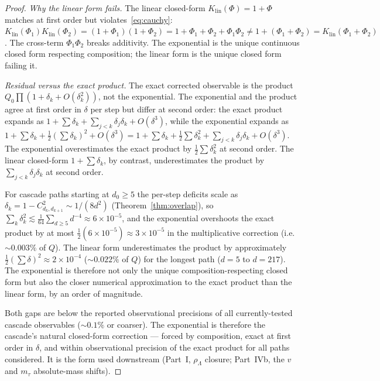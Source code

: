 \documentclass[11pt,a4paper]{article}
\begin{document}
\begin{proof}
\emph{Why the linear form fails.} The linear closed-form
$K_{\mathrm{lin}}(\Phi) = 1 + \Phi$ matches at first order but
violates~\eqref{eq:cauchy}: $K_{\mathrm{lin}}(\Phi_1) K_{\mathrm{lin}}(\Phi_2)
= (1 + \Phi_1)(1 + \Phi_2) = 1 + \Phi_1 + \Phi_2 + \Phi_1\Phi_2 \neq
1 + (\Phi_1 + \Phi_2) = K_{\mathrm{lin}}(\Phi_1 + \Phi_2)$. The cross-term
$\Phi_1\Phi_2$ breaks additivity. The exponential is the unique
continuous closed form respecting composition; the linear form is the
unique closed form failing it.

\emph{Residual versus the exact product.} The exact corrected
observable is the product $Q_0\prod(1 + \delta_k + O(\delta_k^2))$, not
the exponential. The exponential and the product agree at first order
in $\delta$ per step but differ at second order: the exact product
expands as $1 + \sum\delta_k + \sum_{j<k}\delta_j\delta_k + O(\delta^3)$,
while the exponential expands as $1 + \sum\delta_k + \tfrac{1}{2}(\sum\delta_k)^2 + O(\delta^3)
= 1 + \sum\delta_k + \tfrac{1}{2}\sum\delta_k^2 + \sum_{j<k}\delta_j\delta_k + O(\delta^3)$.
The exponential overestimates the exact product by
$\tfrac{1}{2}\sum\delta_k^2$ at second order. The linear closed-form
$1 + \sum\delta_k$, by contrast, underestimates the product by
$\sum_{j<k}\delta_j\delta_k$ at second order.

For cascade paths starting at $d_0\geq 5$ the per-step deficits scale
as $\delta_k = 1 - C^2_{d_k,d_{k+1}} \sim 1/(8d^2)$
(Theorem~\ref{thm:overlap}), so
$\sum_{k}\delta_k^2 \lesssim \tfrac{1}{64}\sum_{d\geq 5} d^{-4} \approx
6\times 10^{-5}$, and the exponential overshoots the exact product by
at most $\tfrac{1}{2}(6\times 10^{-5}) \approx 3\times 10^{-5}$ in the
multiplicative correction (i.e.\ $\sim 0.003\%$ of $Q$). The linear
form underestimates the product by approximately
$\tfrac{1}{2}(\sum\delta)^2 \approx 2\times 10^{-4}$ ($\sim 0.022\%$
of $Q$) for the longest path ($d=5$ to $d=217$). The exponential is
therefore not only the unique composition-respecting closed form but
also the closer numerical approximation to the exact product than the
linear form, by an order of magnitude.

Both gaps are below the reported observational precisions of all
currently-tested cascade observables ($\sim 0.1\%$ or coarser). The
exponential is therefore the cascade's natural closed-form correction
--- forced by composition, exact at first order in $\delta$, and within
observational precision of the exact product for all paths considered.
It is the form used downstream (Part~I, $\rho_\Lambda$ closure;
Part~IVb, the $v$ and $m_\tau$ absolute-mass shifts).
\end{proof}
\end{document}
